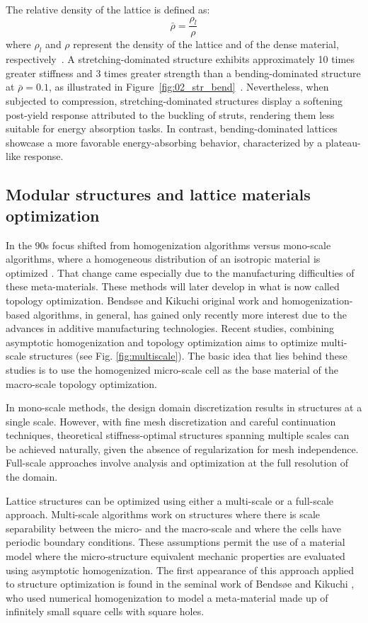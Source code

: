 The relative density of the lattice is defined as:
\begin{equation}
    \bar{\rho} = \frac{\rho_l}{\rho}
\end{equation}
where $\rho_l$ and $\rho$ represent the density of the lattice and of the dense material, respectively~. A stretching-dominated structure exhibits approximately 10 times greater stiffness and 3 times greater strength than a bending-dominated structure at $\bar{\rho} = 0.1$, as illustrated in Figure~\ref{fig:02_str_bend}~\cite{deshpande_foam_2001}. Nevertheless, when subjected to compression, stretching-dominated structures display a softening post-yield response attributed to the buckling of struts, rendering them less suitable for energy absorption tasks. In contrast, bending-dominated lattices showcase a more favorable energy-absorbing behavior, characterized by a plateau-like response.

\subsection{Modular structures and lattice materials optimization}
In the 90s focus shifted from homogenization algorithms versus mono-scale algorithms, where a homogeneous distribution of an isotropic material is optimized . That change came especially due to the manufacturing difficulties of these meta-materials. These methods will later develop in what is now called topology optimization. Bendsøe and Kikuchi original work and homogenization-based algorithms, in general, has gained only recently more interest due to the advances in additive manufacturing technologies. Recent studies, combining asymptotic homogenization and topology optimization aims to optimize multi-scale structures (see Fig. \ref{fig:multiscale}). The basic idea that lies behind these studies is to use the homogenized micro-scale cell as the base material of the macro-scale topology optimization. 

In mono-scale methods, the design domain discretization results in structures at a single scale. However, with fine mesh discretization and careful continuation techniques, theoretical stiffness-optimal structures spanning multiple scales can be achieved naturally, given the absence of regularization for mesh independence. Full-scale approaches involve analysis and optimization at the full resolution of the domain.

Lattice structures can be optimized using either a multi-scale or a full-scale approach. Multi-scale algorithms work on structures where there is scale separability between the micro- and the macro-scale and where the cells have periodic boundary conditions. These assumptions permit the use of a material model where the micro-structure equivalent mechanic properties are evaluated using asymptotic homogenization. The first appearance of this approach applied to structure optimization is found in the seminal work of Bendsøe and Kikuchi , who used numerical homogenization to model a meta-material made up of infinitely small square cells with square holes.



